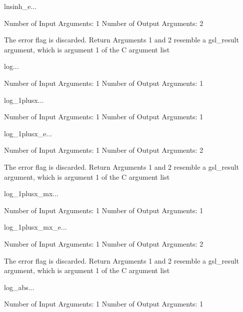 \begin{funcdesc}{lnsinh_e}{...}

    Number of Input  Arguments:  1
    Number of Output Arguments:  2

The error flag is discarded.
Return Arguments 1 and 2 resemble a gsl_result argument,
	which is  argument 1 of the C argument list

\end{funcdesc}

\begin{funcdesc}{log}{...}

    Number of Input  Arguments:  1
    Number of Output Arguments:  1
\end{funcdesc}

\begin{funcdesc}{log_1plusx}{...}

    Number of Input  Arguments:  1
    Number of Output Arguments:  1
\end{funcdesc}

\begin{funcdesc}{log_1plusx_e}{...}

    Number of Input  Arguments:  1
    Number of Output Arguments:  2

The error flag is discarded.
Return Arguments 1 and 2 resemble a gsl_result argument,
	which is  argument 1 of the C argument list

\end{funcdesc}

\begin{funcdesc}{log_1plusx_mx}{...}

    Number of Input  Arguments:  1
    Number of Output Arguments:  1
\end{funcdesc}

\begin{funcdesc}{log_1plusx_mx_e}{...}

    Number of Input  Arguments:  1
    Number of Output Arguments:  2

The error flag is discarded.
Return Arguments 1 and 2 resemble a gsl_result argument,
	which is  argument 1 of the C argument list

\end{funcdesc}

\begin{funcdesc}{log_abs}{...}

    Number of Input  Arguments:  1
    Number of Output Arguments:  1
\end{funcdesc}

